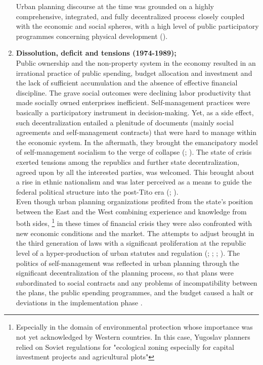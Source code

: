 \documentclass[11pt]{report}
\begin{document}
\begin{enumerate}
Urban planning discourse at the time was grounded on a highly comprehensive, integrated, and fully decentralized process closely coupled with the economic and social spheres, with a high level of public participatory programmes concerning physical development (\href{Nedovic}{\citealt{nedovic-budic_mornings_2011}}).

\item \textbf{Dissolution, deficit and tensions (1974-1989);}
\\
Public ownership and the non-property system in the economy resulted in an irrational practice of public spending, budget allocation and investment and the lack of sufficient accumulation and the absence of effective financial discipline. The grave social outcomes were declining labor productivity that made socially owned enterprises inefficient. Self-management practices were basically a participatory instrument in decision-making. Yet, as a side effect, such decentralization entailed a plenitude of documents (mainly social agreements and self-management contracts) that were hard to manage within the economic system. In the aftermath, they brought the emancipatory model of self-management socialism to the verge of collapse (\href{Lydall}{\citealt{lydall_yugoslav_1986}}; \href{Lydall}{\citealt{lydall_yugoslavia_1989}}).
The state of crisis exerted tensions among the republics and further state decentralization, agreed upon by all the interested parties, was welcomed. This brought about a rise in ethnic nationalism and was later perceived as a means to guide the federal political structure into the post-Tito era (\href{Estrin}{\citealt{estrin_yugoslavia:_1991}}; \href{Vujosevic}{\citealt{vujosevic_postsocijalisticka_2010}}).
\\

Even though urban planning organizations profited from the state’s position between the East and the West combining experience and knowledge from both sides,
\footnote{Especially in the domain of environmental protection whose importance was not yet acknowledged by Western countries. In this case, Yugoslav planners relied on Soviet regulations for "ecological zoning especially for capital investment projects and agricultural plots"}
in these times of financial crisis they were also confronted with new economic conditions and the market. The attempts to adjust brought in the third generation of laws with a significant proliferation at the republic level of a hyper-production of urban statutes and regulation (\href{Borovnica}{\citealt{borovnica_osvrt_1980}}; \href{Pajovic}{\citealt{pajovic_pregled_2005}}; \href{Nedovic}{\citealt{nedovic-budic_mornings_2011}}; \href{Peric}{\citealt{peric_evolution_2016}}).
The politics of self-management was reflected in urban planning through the significant decentralization of the planning process, so that plans were subordinated to social contracts and any problems of incompatibility between the plans, the public spending programmes, and the budget caused a halt or deviations in the implementation phase .


\end{enumerate}
\end{document}
